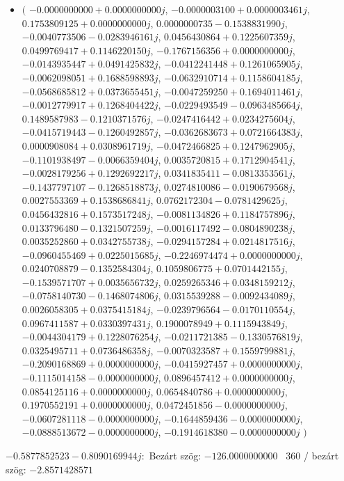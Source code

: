 \documentclass[14pt,a4paper]{article}
\begin{document}
\begin{itemize}
\item
$\big($
$-0.0000000000+0.0000000000j$, $-0.0000003100+0.0000003461j$, $0.1753809125+0.0000000000j$, $0.0000000735-0.1538831990j$, $-0.0040773506-0.0283946161j$, $0.0456430864+0.1225607359j$, $0.0499769417+0.1146220150j$, $-0.1767156356+0.0000000000j$, $-0.0143935447+0.0491425832j$, $-0.0412241448+0.1261065905j$, $-0.0062098051+0.1688598893j$, $-0.0632910714+0.1158604185j$, $-0.0568685812+0.0373655451j$, $-0.0047259250+0.1694011461j$, $-0.0012779917+0.1268404422j$, $-0.0229493549-0.0963485664j$, $0.1489587983-0.1210371576j$, $-0.0247416442+0.0234275604j$, $-0.0415719443-0.1260492857j$, $-0.0362683673+0.0721664383j$, $0.0000908084+0.0308961719j$, $-0.0472466825+0.1247962905j$, $-0.1101938497-0.0066359404j$, $0.0035720815+0.1712904541j$, $-0.0028179256+0.1292692217j$, $0.0341835411-0.0813353561j$, $-0.1437797107-0.1268518873j$, $0.0274810086-0.0190679568j$, $0.0027553369+0.1538686841j$, $0.0762172304-0.0781429625j$, $0.0456432816+0.1573517248j$, $-0.0081134826+0.1184757896j$, $0.0133796480-0.1321507259j$, $-0.0016117492-0.0804890238j$, $0.0035252860+0.0342755738j$, $-0.0294157284+0.0214817516j$, $-0.0960455469+0.0225015685j$, $-0.2246974474+0.0000000000j$, $0.0240708879-0.1352584304j$, $0.1059806775+0.0701442155j$, $-0.1539571707+0.0035656732j$, $0.0259265346+0.0348159212j$, $-0.0758140730-0.1468074806j$, $0.0315539288-0.0092434089j$, $0.0026058305+0.0375415184j$, $-0.0239796564-0.0170110554j$, $0.0967411587+0.0330397431j$, $0.1900078949+0.1115943849j$, $-0.0044304179+0.1228076254j$, $-0.0211721385-0.1330576819j$, $0.0325495711+0.0736486358j$, $-0.0070323587+0.1559799881j$, $-0.2090168869+0.0000000000j$, $-0.0415927457+0.0000000000j$, $-0.1115014158-0.0000000000j$, $0.0896457412+0.0000000000j$, $0.0854125116+0.0000000000j$, $0.0654840786+0.0000000000j$, $0.1970552191+0.0000000000j$, $0.0472451856-0.0000000000j$, $-0.0607281118-0.0000000000j$, $-0.1644859436-0.0000000000j$, $-0.0888513672-0.0000000000j$, $-0.1914618380-0.0000000000j$
$\big)$
\end{itemize}
$-0.5877852523-0.8090169944j$:\
Bezárt szög: $-126.0000000000$ \
360 / bezárt szög: $-2.8571428571$\
\end{document}
